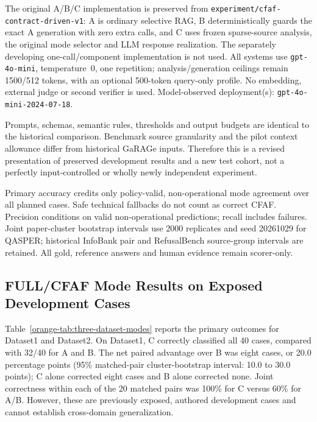 The original A/B/C implementation is preserved from \texttt{experiment/cfaf-contract-driven-v1}: A is ordinary selective RAG, B deterministically guards the exact A generation with zero extra calls, and C uses frozen sparse-source analysis, the original mode selector and LLM response realization. The separately developing one-call/component implementation is not used. All systems use \texttt{gpt-4o-mini}, temperature~0, one repetition; analysis/generation ceilings remain 1500/512 tokens, with an optional 500-token query-only profile. No embedding, external judge or second verifier is used. Model-observed deployment(s): \texttt{gpt-4o-mini-2024-07-18}.

Prompts, schemas, semantic rules, thresholds and output budgets are identical to the historical comparison. Benchmark source granularity and the pilot context allowance differ from historical GaRAGe inputs. Therefore this is a revised presentation of preserved development results and a new test cohort, not a perfectly input-controlled or wholly newly independent experiment.

Primary accuracy credits only policy-valid, non-operational mode agreement over all planned cases. Safe technical fallbacks do not count as correct CFAF. Precision conditions on valid non-operational predictions; recall includes failures. Joint paper-cluster bootstrap intervals use 2000 replicates and seed 20261029 for QASPER; historical InfoBank pair and RefusalBench source-group intervals are retained. All gold, reference answers and human evidence remain scorer-only.

\subsection{FULL/CFAF Mode Results on Exposed Development Cases}

Table~\ref{orange-tab:three-dataset-modes} reports the primary outcomes for Dataset1 and Dataset2. On Dataset1, C correctly classified all 40 cases, compared with 32/40 for A and B. The net paired advantage over B was eight cases, or 20.0 percentage points (95\% matched-pair cluster-bootstrap interval: 10.0 to 30.0 points); C alone corrected eight cases and B alone corrected none. Joint correctness within each of the 20 matched pairs was 100\% for C versus 60\% for A/B. However, these are previously exposed, authored development cases and cannot establish cross-domain generalization.

